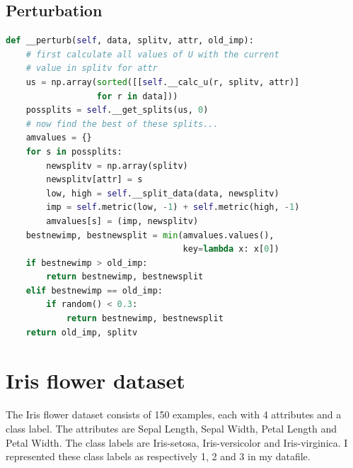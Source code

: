 \documentclass[12pt]{article}
\begin{document}
\subsection{Perturbation}
\begin{lstlisting}[language=Python]
def __perturb(self, data, splitv, attr, old_imp):
    # first calculate all values of U with the current 
    # value in splitv for attr
    us = np.array(sorted([[self.__calc_u(r, splitv, attr)]
                  for r in data]))
    possplits = self.__get_splits(us, 0)
    # now find the best of these splits...
    amvalues = {}
    for s in possplits:
        newsplitv = np.array(splitv)
        newsplitv[attr] = s
        low, high = self.__split_data(data, newsplitv)
        imp = self.metric(low, -1) + self.metric(high, -1)
        amvalues[s] = (imp, newsplitv)
    bestnewimp, bestnewsplit = min(amvalues.values(), 
                                   key=lambda x: x[0])
    if bestnewimp > old_imp:
        return bestnewimp, bestnewsplit
    elif bestnewimp == old_imp:
        if random() < 0.3:
            return bestnewimp, bestnewsplit
    return old_imp, splitv
\end{lstlisting}

\section{Iris flower dataset}
The Iris flower dataset consists of 150 examples, each with 4 attributes and a class label. The attributes are Sepal Length, Sepal Width, Petal Length and Petal Width. The class labels are Iris-setosa, Iris-versicolor and Iris-virginica. I represented these class labels as respectively 1, 2 and 3 in my datafile.
\end{document}
